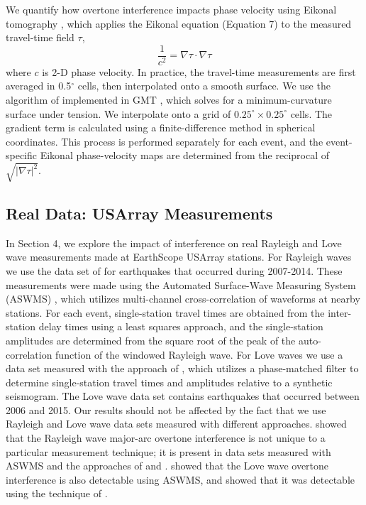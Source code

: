 \documentclass[extra,mreferee]{gji}
\begin{document}
We quantify how overtone interference impacts phase velocity using Eikonal tomography \citep{lin2009eikonal}, which applies the Eikonal equation (Equation 7) to the measured travel-time field $\tau$,  
\begin{equation}
\frac{1}{c^2} = \nabla \tau \cdot \nabla \tau
\end{equation}
\noindent
where $c$ is 2-D phase velocity. In practice, the travel-time measurements are first averaged in 0.5$^\circ$ cells, then interpolated onto a smooth surface. We use the algorithm of \citet{smith1990gridding} implemented in GMT \citep{wessel1998new}, which solves for a minimum-curvature surface under tension. We interpolate onto a grid of $0.25^\circ \times 0.25^\circ$ cells. The gradient term is calculated using a finite-difference method in spherical coordinates. This process is
performed separately for each event, and the event-specific Eikonal phase-velocity maps are determined from the reciprocal of $\sqrt{|\nabla \tau|^2}$. 

\subsection{Real Data: USArray Measurements}

In Section 4, we explore the impact of interference on real Rayleigh and Love wave measurements made at EarthScope USArray stations. 
For Rayleigh waves we use the data set of \citet{babikoff2019long} for earthquakes that occurred during 2007-2014. These measurements were made using the Automated Surface-Wave Measuring System (ASWMS) \citep{jingmcc}, which utilizes multi-channel cross-correlation of waveforms at nearby stations. For each event, single-station travel times are obtained from the inter-station delay times using a least squares approach, and the single-station amplitudes are determined from the square root of the peak of the auto-correlation function of the windowed Rayleigh wave. For Love waves we use a data set measured with the approach of \citet{ekstrom1997measurements}, which utilizes a phase-matched filter to determine single-station travel times and amplitudes relative to a synthetic seismogram. The Love wave data set contains earthquakes that occurred between 2006 and 2015. Our results should not be affected by the fact that we use Rayleigh and Love wave data sets measured with different approaches.  \citet{hariharan2020evidence} showed that the Rayleigh wave major-arc overtone interference is not unique to a particular measurement technique; it is present in data sets measured with ASWMS and the approaches of \citet{ekstrom1997measurements} and \citet{ma2014comprehensive}. \citet{jingmcc} showed that the Love wave overtone interference is also detectable using ASWMS, and \citet{foster2014overtone} showed that it was detectable using the technique of \citet{ekstrom1997measurements}.
\end{document}
